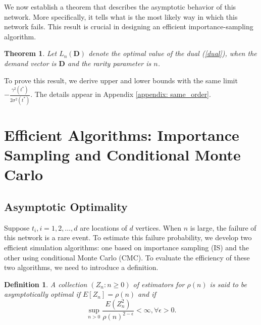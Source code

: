 \documentclass[final,11pt,3p]{article}\usepackage{setspace}
\newtheorem{theorem}{Theorem}
\newtheorem{definition}{Definition}
\begin{document}
We now establish a theorem that describes the asymptotic behavior of this network. More
specifically, it tells what is the most likely way in which this network
fails. This result is crucial in designing an efficient importance-sampling algorithm.

 

\begin{theorem}
\label{same_order} Let $L_{n}(\boldsymbol{D})$ denote the optimal value of the
dual (\ref{dual}), when the demand vector is $\boldsymbol{D}$ and the rarity
parameter is $n$. {{}}
\end{theorem}

To prove this result, we derive upper and lower bounds with the same limit $-\frac{\gamma^{2}(t^{*})}{2\sigma^{2}(t^{*})} $. The details appear in Appendix \ref{appendix: same_order}.

\section{Efficient Algorithms: Importance Sampling and Conditional Monte Carlo}

\label{sec:sim}

\subsection{Asymptotic Optimality}

Suppose $t_{i}, i=1,2,\dots, d$ are locations of $d$ vertices. When $n$ is large, the failure of this network is a rare event. To
estimate this failure probability, we develop two efficient simulation
algorithms: one based on importance sampling (IS) and the other using
conditional Monte Carlo (CMC). To evaluate the efficiency of these two
algorithms, we need to introduce a definition.

\begin{definition}
A collection $(Z_{n}: n \ge0)$ of estimators for $\rho(n)$ is said to be
asymptotically optimal if $E[Z_{n}] = \rho(n)$ and if
\[
\sup_{n>0} \frac{E(Z_{n}^{2})}{\rho(n)^{2-\epsilon}} < \infty, \forall
\epsilon> 0.
\]

\end{definition}
\end{document}
